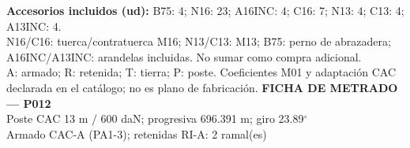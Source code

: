 \begingroup\scriptsize
\textbf{Accesorios incluidos (ud):} B75: 4; N16: 23; A16INC: 4; C16: 7; N13: 4; C13: 4; A13INC: 4.\\
N16/C16: tuerca/contratuerca M16; N13/C13: M13; B75: perno de abrazadera; A16INC/A13INC: arandelas incluidas. No sumar como compra adicional.\\
A: armado; R: retenida; T: tierra; P: poste. Coeficientes M01 y adaptación CAC declarada en el catálogo; no es plano de fabricación.
\endgroup\endgroup
\clearpage{}
\begingroup\small\setlength{\parskip}{3pt}\renewcommand{\arraystretch}{1.05}
\textbf{\large FICHA DE METRADO — P012}\\[4pt]
Poste CAC 13 m / 600 daN; progresiva 696.391 m; giro 23.89\ensuremath{^\circ}\\
Armado CAC-A (PA1-3); retenidas RI-A: 2 ramal(es)\\
\begingroup\scriptsize
